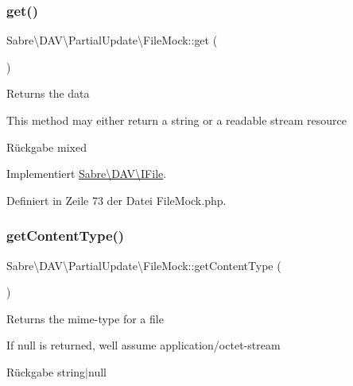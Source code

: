 \subsubsection{\texorpdfstring{get()}{get()}}
{\footnotesize\ttfamily Sabre\textbackslash{}\+D\+A\+V\textbackslash{}\+Partial\+Update\textbackslash{}\+File\+Mock\+::get (\begin{DoxyParamCaption}{ }\end{DoxyParamCaption})}

Returns the data

This method may either return a string or a readable stream resource

\begin{DoxyReturn}{Rückgabe}
mixed 
\end{DoxyReturn}


Implementiert \mbox{\hyperlink{interface_sabre_1_1_d_a_v_1_1_i_file_a3102812af0567c3cfd9cd6c20104bd27}{Sabre\textbackslash{}\+D\+A\+V\textbackslash{}\+I\+File}}.



Definiert in Zeile 73 der Datei File\+Mock.\+php.

\mbox{\label{class_sabre_1_1_d_a_v_1_1_partial_update_1_1_file_mock_a579203d7c6b0516a0fe0bd27f83ff275}} 
\subsubsection{\texorpdfstring{get\+Content\+Type()}{getContentType()}}
{\footnotesize\ttfamily Sabre\textbackslash{}\+D\+A\+V\textbackslash{}\+Partial\+Update\textbackslash{}\+File\+Mock\+::get\+Content\+Type (\begin{DoxyParamCaption}{ }\end{DoxyParamCaption})}

Returns the mime-\/type for a file

If null is returned, we\textquotesingle{}ll assume application/octet-\/stream

\begin{DoxyReturn}{Rückgabe}
string$\vert$null 
\end{DoxyReturn}


